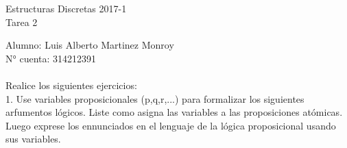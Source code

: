 \documentclass{article}
\begin{document}
\begin{center}
  Estructuras Discretas 2017-1\\
  Tarea 2\\
\end{center}
Alumno: Luis Alberto Martinez Monroy\\
N° cuenta: 314212391\\ \\

 Realice los siguientes ejercicios:\\
1. Use variables proposicionales (p,q,r,...) para formalizar los siguientes arfumentos lógicos. Liste como asigna las variables a las proposiciones atómicas. Luego exprese los ennunciados en el lenguaje de la lógica proposicional usando sus variables.\\\\
\end{document}
